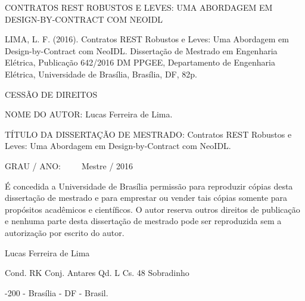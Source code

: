 \vspace{-1mm}

\noindent CONTRATOS REST ROBUSTOS E LEVES: UMA ABORDAGEM EM
DESIGN-BY-CONTRACT COM NEOIDL

\noindent  LIMA, L. F. (2016). Contratos REST Robustos e Leves: Uma
Abordagem em Design-by-Contract com NeoIDL. Dissertação de Mestrado em
Engenharia Elétrica, Publicação 642/2016 DM PPGEE, Departamento de Engenharia Elétrica,
Universidade de Brasília, Brasília, DF, 82p.



\vspace{6mm}

\noindent \begin{bf} \MakeUppercase{Cessão de Direitos} \end{bf}

\vspace{5mm}

\noindent NOME DO AUTOR: Lucas Ferreira de Lima.
\vspace{6mm}

\noindent TÍTULO DA DISSERTAÇÃO DE MESTRADO: Contratos REST Robustos e Leves: Uma
Abordagem em Design-by-Contract com NeoIDL. 

\vspace{3mm}
\noindent GRAU / ANO:~ ~ ~ Mestre / 2016

\vspace{5mm}

\noindent É concedida a Universidade de Brasília permissão para reproduzir
cópias desta dissertação de mestrado e para emprestar ou vender tais cópias
somente para propósitos acadêmicos e científicos. O autor reserva outros
direitos de publicação e nenhuma parte desta dissertação de mestrado pode ser
reproduzida sem a autorização por escrito do autor.

\vspace{5mm}

\noindent \underline{\hspace{65mm}}

\vspace{-2mm}

\noindent  Lucas Ferreira de Lima
   \vspace{-2mm}

\noindent Cond. RK Conj. Antares Qd. L Cs. 48 Sobradinho 
    \vspace{-2mm}
    
-200 - Brasília - DF - Brasil.

\pagebreak


